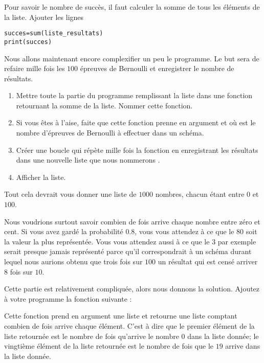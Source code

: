 Pour savoir le nombre de succès, il faut calculer la somme de tous les éléments de la liste. Ajouter les lignes
\begin{verbatim}
succes=sum(liste_resultats)
print(succes)
\end{verbatim}


Nous allons maintenant encore complexifier un peu le programme. Le but sera de refaire mille fois les \( 100\) épreuves de Bernoulli et enregistrer le nombre de résultats.
\begin{enumerate}
    \item
        Mettre toute la partie du programme remplissant la liste  dans une fonction retournant la somme de la liste. Nommer  cette fonction.
    \item
        Si vous êtes à l'aise, faite que cette fonction prenne en argument  et  où  est le nombre d'épreuves de Bernoulli à effectuer dans un schéma.
    \item
        Créer une boucle  qui répète mille fois la fonction  en enregistrant les résultats dans une nouvelle liste que nous nommerons .
    \item
        Afficher la liste.
\end{enumerate}
Tout cela devrait vous donner une liste de \( 1000\) nombres, chacun étant entre \( 0\) et \( 100\).

Nous voudrions surtout savoir combien de fois arrive chaque nombre entre zéro et cent. Si vous avez gardé la probabilité \( 0.8\), vous vous attendez à ce que le \( 80\) soit la valeur la plus représentée. Vous vous attendez aussi à ce que le \( 3\) par exemple serait presque jamais représenté parce qu'il correspondrait à un schéma durant lequel nous aurions obtenu que trois fois sur \( 100\) un résultat qui est censé arriver \( 8\) fois sur \( 10\).

Cette partie est relativement compliquée, alors nous donnons la solution. Ajoutez à votre programme la fonction suivante :



Cette fonction prend en argument une liste et retourne une liste comptant combien de fois arrive chaque élément. C'est à dire que le premier élément de la liste retournée est le nombre de fois qu'arrive le nombre \( 0\) dans la liste donnée; le vingtième élément de la liste retournée est le nombre de fois que le \( 19\) arrive dans la liste donnée.

